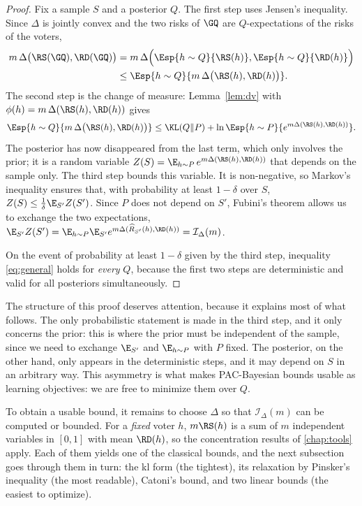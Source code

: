 \begin{proof}
Fix a sample $S$ and a posterior $Q$. The first step uses Jensen's
inequality. Since $\Delta$ is jointly convex and the two risks of $\GQ$ are
$Q$-expectations of the risks of the voters,
\begin{align*}
m\,\Delta\big(\RS(\GQ),\RD(\GQ)\big)
&=m\,\Delta\Big(\Esp{h\sim Q}{\RS(h)},\Esp{h\sim Q}{\RD(h)}\Big)\\
&\leq\Esp{h\sim Q}{m\,\Delta\big(\RS(h),\RD(h)\big)}.
\end{align*}
The second step is the change of measure: Lemma~\ref{lem:dv} with
$\phi(h)=m\,\Delta(\RS(h),\RD(h))$ gives
\[
\Esp{h\sim Q}{m\,\Delta\big(\RS(h),\RD(h)\big)}\leq\KL(Q\|P)+\ln\Esp{h\sim P}{e^{m\Delta(\RS(h),\RD(h))}}.
\]
The posterior has now disappeared from the last term, which only involves the
prior; it is a random variable $Z(S)=\E_{h\sim P}\,e^{m\Delta(\RS(h),\RD(h))}$
that depends on the sample only. The third step bounds this variable. It is
non-negative, so Markov's inequality ensures that, with probability at least
$1-\delta$ over $S$, $Z(S)\leq\frac1\delta\E_{S'}Z(S')$. Since $P$ does not
depend on $S'$, Fubini's theorem allows us to exchange the two expectations,
$\E_{S'}Z(S')=\E_{h\sim P}\E_{S'}e^{m\Delta(\widehat R_{S'}(h),\RD(h))}=\mathcal I_\Delta(m)$.

On the event of probability at least $1-\delta$ given by the third step,
inequality \eqref{eq:general} holds for \emph{every} $Q$, because the first
two steps are deterministic and valid for all posteriors simultaneously.
\end{proof}

The structure of this proof deserves attention, because it explains most of
what follows. The only probabilistic statement is made in the third step, and
it only concerns the prior: this is where the prior must be independent of the
sample, since we need to exchange $\E_{S'}$ and $\E_{h\sim P}$ with $P$
fixed. The posterior, on the other hand, only appears in the deterministic
steps, and it may depend on $S$ in an arbitrary way. This asymmetry is what
makes PAC-Bayesian bounds usable as learning objectives: we are free to
minimize them over $Q$.

To obtain a usable bound, it remains to choose $\Delta$ so that $\mathcal
I_\Delta(m)$ can be computed or bounded. For a \emph{fixed} voter $h$, $m\RS(h)$
is a sum of $m$ independent variables in $[0,1]$ with mean $\RD(h)$, so the
concentration results of \cref{chap:tools} apply. Each of them yields one of the
classical bounds, and the next subsection goes through them in turn: the kl form
(the tightest), its relaxation by Pinsker's inequality (the most readable),
Catoni's bound, and two linear bounds (the easiest to optimize).

